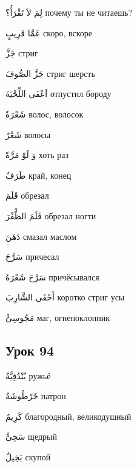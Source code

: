 \documentclass[a5paper]{article}
\newcommand\textstyleDropCaps[1]{#1}
\newcommand\textstyleCaptioncharacters[1]{#1}
\begin{document}
\textstyleCaptioncharacters{لِمَ لاَ تَقْرَأُ؟ }\textstyleDropCaps{почему ты не читаешь?‎}

\textstyleCaptioncharacters{عَمَّا قَرِيبٍ }\textstyleDropCaps{скоро, вскоре‎}

\textstyleCaptioncharacters{جَزَّ }\textstyleDropCaps{стриг‎}

\textstyleCaptioncharacters{جَزَّ الصُّوفَ }\textstyleDropCaps{стриг шерсть‎}

\textstyleCaptioncharacters{اَعْفَى اللِّحْيَةَ }\textstyleDropCaps{отпустил бороду‎}

\textstyleCaptioncharacters{شَعْرَةٌ }\textstyleDropCaps{волос, волосок‎}

\textstyleCaptioncharacters{شَعْرٌ }\textstyleDropCaps{волосы‎}

\textstyleCaptioncharacters{وَ لَوْ مَرَّةً }\textstyleDropCaps{хоть раз‎}

\textstyleCaptioncharacters{طَرَفٌ }\textstyleDropCaps{край, конец‎}

\textstyleCaptioncharacters{قَلَمَ }\textstyleDropCaps{обрезал‎}

\textstyleCaptioncharacters{قَلَمَ الظُّفْرَ }\textstyleDropCaps{обрезал ногти‎}

\textstyleCaptioncharacters{دَهَنَ }\textstyleDropCaps{смазал маслом‎}

\textstyleCaptioncharacters{سَرَّحَ }\textstyleDropCaps{причесал‎}

\textstyleCaptioncharacters{سَرَّحَ شَعْرَهُ }\textstyleDropCaps{причёсывалс­я‎}

\textstyleCaptioncharacters{أَحْفَى الشَّارِبَ }\textstyleDropCaps{коротко стриг усы‎}

\textstyleCaptioncharacters{مَجُوسِىٌّ }\textstyleDropCaps{маг, огне­поклонник‎}

\subsection[Урок 94‎]{\textstyleDropCaps{Урок 94‎}}
\textstyleCaptioncharacters{بُنْدُقِيَّةٌ }\textstyleDropCaps{ружьё‎}

\textstyleCaptioncharacters{خَرْطُوشَةٌ }\textstyleDropCaps{патрон‎}

\textstyleCaptioncharacters{كَرِيمٌ }\textstyleDropCaps{благородный, вели­кодушный‎}

\textstyleCaptioncharacters{سَخِىٌّ }\textstyleDropCaps{щедрый‎}

\textstyleCaptioncharacters{بَخِيلٌ }\textstyleDropCaps{скупой‎}
\end{document}
